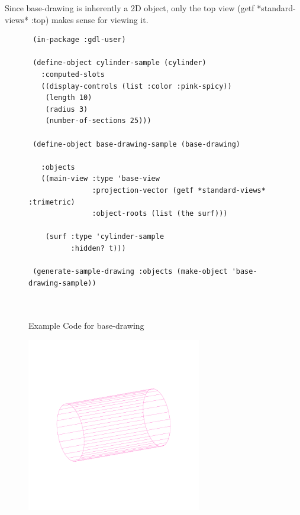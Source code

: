 \documentclass [11pt]{book}
\begin{document}
\begin{itemize}
\begin{description}
Since base-drawing is inherently a 2D object, only the top view (getf *standard-views* :top) 
makes sense for viewing it.



\end{description}




\begin{figure}
\begin{lrbox}{\boxedverb}
\begin{minipage}{\linewidth}
{\small

\begin{verbatim}
 (in-package :gdl-user)

 (define-object cylinder-sample (cylinder)
   :computed-slots
   ((display-controls (list :color :pink-spicy))
    (length 10)
    (radius 3)
    (number-of-sections 25)))

 (define-object base-drawing-sample (base-drawing)
  
   :objects
   ((main-view :type 'base-view
               :projection-vector (getf *standard-views* :trimetric)
               :object-roots (list (the surf)))
 
    (surf :type 'cylinder-sample
          :hidden? t))) 

 (generate-sample-drawing :objects (make-object 'base-drawing-sample))                

 
\end{verbatim}}
\end{minipage}
\end{lrbox}
\fbox{\usebox{\boxedverb}}

\caption{Example Code for base-drawing}

\label{fig:example-code-base-drawing}

\end{figure}

\begin{figure}
\begin{center}
\includegraphics[width=3in,height=3in]{../images/example-base-drawing.pdf}
\end{center}


\end{figure}
\end{itemize}
\end{document}
